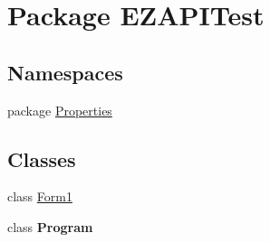 \hypertarget{namespace_e_z_a_p_i_test}{\section{Package E\-Z\-A\-P\-I\-Test}
\label{namespace_e_z_a_p_i_test}
}
\subsection*{Namespaces}
\begin{DoxyCompactItemize}
\item 
package \hyperlink{namespace_e_z_a_p_i_test_1_1_properties}{Properties}
\end{DoxyCompactItemize}
\subsection*{Classes}
\begin{DoxyCompactItemize}
\item 
class \hyperlink{class_e_z_a_p_i_test_1_1_form1}{Form1}
\item 
class {\bfseries Program}
\end{DoxyCompactItemize}
